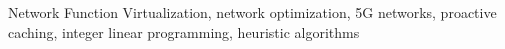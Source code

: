 \documentclass[journal]{IEEEtran}
\begin{document}
\begin{IEEEkeywords}
  Network Function Virtualization, network optimization, 5G networks, proactive caching, integer linear programming, heuristic algorithms
\end{IEEEkeywords}






%
\IEEEpeerreviewmaketitle
\end{document}

